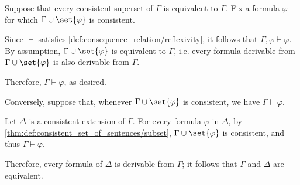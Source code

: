 \begin{defproof}
   Suppose that every consistent superset of \( \Gamma \) is equivalent to \( \Gamma \). Fix a formula \( \varphi \) for which \( \Gamma \cup \set{ \varphi } \) is consistent.

  Since \( {\vdash} \) satisfies \eqref{def:consequence_relation/reflexivity}, it follows that \( \Gamma, \varphi \vdash \varphi \). By assumption, \( \Gamma \cup \set{ \varphi } \) is equivalent to \( \Gamma \), i.e. every formula derivable from \( \Gamma \cup \set{ \varphi } \) is also derivable from \( \Gamma \).

  Therefore, \( \Gamma \vdash \varphi \), as desired.

   Conversely, suppose that, whenever \( \Gamma \cup \set{ \varphi } \) is consistent, we have \( \Gamma \vdash \varphi \).

  Let \( \Delta \) is a consistent extension of \( \Gamma \). For every formula \( \varphi \) in \( \Delta \), by \cref{thm:def:consistent_set_of_sentences/subset}, \( \Gamma \cup \set{ \varphi } \) is consistent, and thus \( \Gamma \vdash \varphi \).

  Therefore, every formula of \( \Delta \) is derivable from \( \Gamma \); it follows that \( \Gamma \) and \( \Delta \) are equivalent.
\end{defproof}

